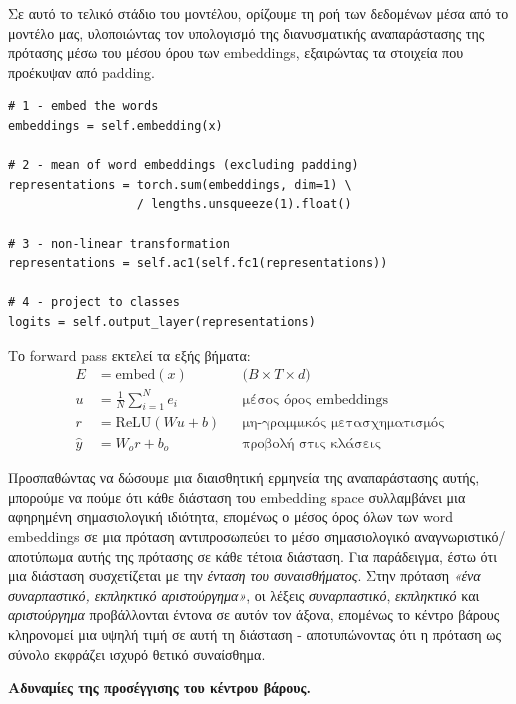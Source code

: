 \documentclass[12pt]{article}
\begin{document}
Σε αυτό το τελικό στάδιο του μοντέλου, ορίζουμε τη ροή των δεδομένων μέσα από το μοντέλο μας, υλοποιώντας τον υπολογισμό της διανυσματικής αναπαράστασης της πρότασης μέσω του μέσου όρου των embeddings, εξαιρώντας τα στοιχεία που προέκυψαν από padding.

\begin{lstlisting}
# 1 - embed the words
embeddings = self.embedding(x)

# 2 - mean of word embeddings (excluding padding)
representations = torch.sum(embeddings, dim=1) \
                  / lengths.unsqueeze(1).float()

# 3 - non-linear transformation
representations = self.ac1(self.fc1(representations))

# 4 - project to classes
logits = self.output_layer(representations)
\end{lstlisting}

Το forward pass εκτελεί τα εξής βήματα:
\begin{align}
    E &= \text{embed}(x) && \text{(}B \times T \times d\text{)} \label{eq:embed}\\
    u &= \frac{1}{N}\sum_{i=1}^{N} e_i && \text{μέσος όρος embeddings} \label{eq:mean}\\
    r &= \text{ReLU}(Wu + b) && \text{μη-γραμμικός μετασχηματισμός} \label{eq:relu}\\
    \hat{y} &= W_o r + b_o && \text{προβολή στις κλάσεις} \label{eq:proj}
\end{align}

Προσπαθώντας να δώσουμε μια διαισθητική ερμηνεία της αναπαράστασης αυτής, μπορούμε να πούμε ότι κάθε διάσταση του embedding space συλλαμβάνει μια αφηρημένη σημασιολογική ιδιότητα, επομένως ο μέσος όρος όλων των word embeddings σε μια πρόταση αντιπροσωπεύει το μέσο σημασιολογικό αναγνωριστικό/αποτύπωμα αυτής της πρότασης σε κάθε τέτοια διάσταση.
Για παράδειγμα, έστω ότι μια διάσταση συσχετίζεται με την \emph{ένταση του συναισθήματος}. Στην πρόταση \emph{«ένα συναρπαστικό, εκπληκτικό αριστούργημα»}, οι λέξεις \emph{συναρπαστικό}, \emph{εκπληκτικό} και \emph{αριστούργημα} προβάλλονται έντονα σε αυτόν τον άξονα, επομένως το κέντρο βάρους κληρονομεί μια υψηλή τιμή σε αυτή τη διάσταση - αποτυπώνοντας ότι η πρόταση ως σύνολο εκφράζει ισχυρό θετικό συναίσθημα.

\textbf{Αδυναμίες της προσέγγισης του κέντρου βάρους.}
\end{document}
